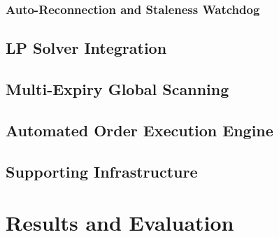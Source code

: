 \documentclass[openany]{book}
\numberwithin{figure}{chapter}
\numberwithin{equation}{chapter}
\begin{document}
\subsection{Auto-Reconnection and Staleness Watchdog}

\section{LP Solver Integration}

\section{Multi-Expiry Global Scanning}

\section{Automated Order Execution Engine}

\section{Supporting Infrastructure}

\chapter{Results and Evaluation}
\end{document}
